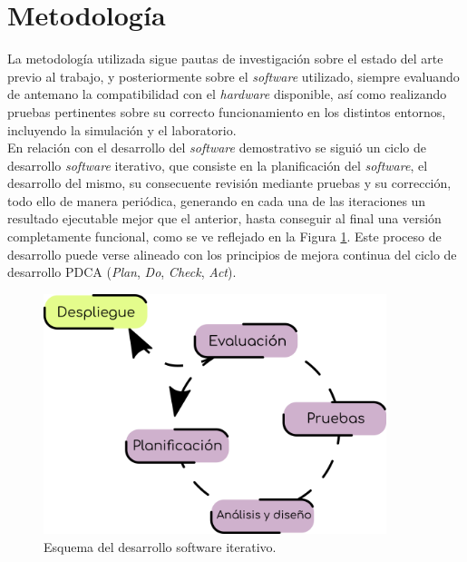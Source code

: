 
\section{Metodología}
\label{sec:metodologia}

La metodología utilizada sigue pautas de investigación sobre el estado del arte
previo al trabajo, y posteriormente sobre el \textit{software} utilizado,
siempre evaluando de antemano la compatibilidad con el \textit{hardware}
disponible, así como realizando pruebas pertinentes sobre su correcto
funcionamiento en los distintos entornos, incluyendo la simulación y el
laboratorio.
\\

En relación con el desarrollo del \textit{software} demostrativo se siguió un
ciclo de desarrollo \textit{software} iterativo, que consiste en la
planificación del \textit{software}, el desarrollo del mismo, su consecuente
revisión mediante pruebas y su corrección, todo ello de manera periódica,
generando en cada una de las iteraciones un resultado ejecutable mejor que el
anterior, hasta conseguir al final una versión completamente funcional, como se
ve reflejado en la Figura \ref{fig:desarrollo_iterativo}.
Este proceso de desarrollo puede verse alineado con los principios de mejora
continua del ciclo de desarrollo PDCA (\textit{Plan}, \textit{Do},
\textit{Check}, \textit{Act}).
\\

\begin{figure} [h!]
  \begin{center}
    \includegraphics[width=10cm]{figs/desarrollo_iterativo}
  \end{center}
  \caption{Esquema del desarrollo software iterativo.}
  \label{fig:desarrollo_iterativo}
\end{figure}\

